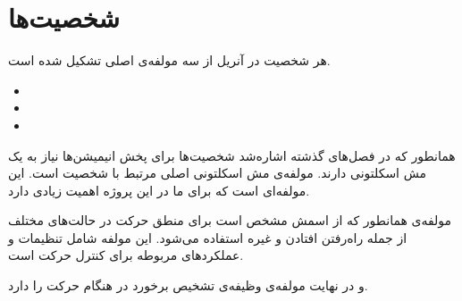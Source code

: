 \section{شخصیت‌ها}

هر شخصیت در آنریل از سه مولفه‌ی اصلی تشکیل شده است.


\begin{itemize}
	\item {}
	\item {}
	\item {}
\end{itemize}


همانطور که در فصل‌های گذشته اشاره‌شد شخصیت‌ها برای پخش انیمیشن‌‌ها نیاز به یک مش اسکلتونی دارند.
مولفه‌ی 
 مش اسکلتونی اصلی مرتبط با شخصیت است.
این مولفه‌ای است که برای ما در این پروژه اهمیت زیادی دارد.

مولفه‌ی 
همانطور که از اسمش مشخص است برای منطق حرکت در حالت‌های مختلف از جمله راه‌رفتن افتادن و غیره استفاده می‌شود.
این مولفه شامل تنظیمات و عملکرد‌های مربوطه برای کنترل حرکت است.

و در نهایت مولفه‌‌ی
وظیفه‌ی تشخیص برخورد در هنگام حرکت را دارد.


